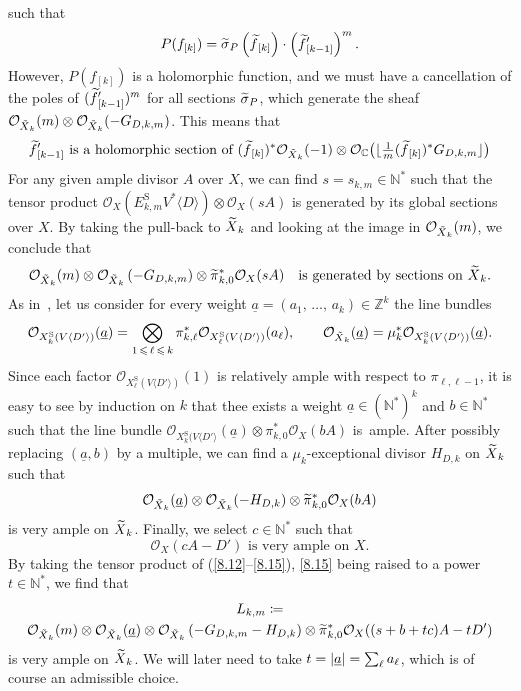 \documentclass[AHL,Unicode,longabstracts,published]{cedram}
\DeclarePairedDelimiter{\abs}{\lvert}{\rvert}
\newcommand*\rS{\mathrm{S}}
\newcommand*\cO{\mathcal{O}}
\newcommand*\bC{\mathbb{C}}
\newcommand*\bN{\mathbb{N}}
\newcommand*\bZ{\mathbb{Z}}
\let\leq\leqslant
\newcommand*\bydef{\coloneqq}
\let\oldtilde\tilde
\renewcommand*{\tilde}[1]{\mathchoice{\widetilde{#1}}{\widetilde{#1}}{\oldtilde{#1}}{\oldtilde{#1}}}
\begin{document}
such that
\[
P(f_{[k]})=\tilde\sigma_P\left(\tilde f_{[k]}\right)\cdot \left(\tilde f'_{[k-1]}\right)^m.
\]
However, $P(f_{[k]})$ is a holomorphic function, and we must have a cancellation of the poles of $(\tilde f'_{[k-1]})^m$ for all sections
$\tilde\sigma_P$, which generate the sheaf
$\cO_{\tilde X_k}(m)\otimes \cO_{\tilde X_k}(-G_{D,k,m})$. This means that
\begin{equation}\label{8.11}
\tilde f'_{[k-1]}
\text{ is a holomorphic section of } (\tilde f_{[k]})^*\cO_{\tilde X_k}(-1)\otimes
\cO_\bC\big(\lfloor\tfrac{1}{ m}(\tilde f_{[k]})^*G_{D,k,m}\rfloor\big)
\end{equation}
For any given ample divisor $A$ over $X$, we can find $s=s_{k,m}\in\bN^*$ such that the tensor product
$\cO_X(E^\rS_{k,m}V^*\langle D\rangle)\otimes\cO_X(sA)$ is generated by its global sections over $X$. By taking the pull-back to $\tilde X_k$ and looking at the image in $\cO_{\tilde X_k}(m)$, we conclude that
\begin{equation}\label{8.12}
\cO_{\tilde X_k}(m)\otimes\cO_{\tilde X_k}\left(-G_{D,k,m}\right)\otimes
\tilde\pi_{k,0}^*\cO_X(sA)\quad\text{is generated by sections on $\tilde X_k$}.
\end{equation}
As in~\cite{Dem97}, let us consider for every weight
$\underline a=(a_1,\,\dotsc,\,a_k)\in\bZ^k$ the line bundles
\begin{equation}\label{8.13}
\cO_{X^\rS_k(V\langle D'\rangle)}(\underline a)=
\bigotimes_{1\,\leq\,\ell\,\leq\,k}\pi_{k,\ell}^*\cO_{X^\rS_\ell(V\langle D'\rangle)}(a_\ell),
\qquad
\cO_{\tilde X_k}(\underline a)=\mu_k^*
\cO_{X^\rS_k(V\langle D'\rangle)}(\underline a).
\end{equation}
Since each factor $\cO_{X^\rS_\ell(V\langle D'\rangle)}(1)$ is relatively ample with respect to $\pi_{\ell,\ell-1}$, it is easy to see by induction on $k$ that thee exists a weight $\underline a\in(\bN^*)^k$ and $b\in\bN^*$ such that the line bundle
$\cO_{X^\rS_k(V\langle D'\rangle}(\underline a)\otimes\pi_{k,0}^*\cO_X(bA)$ is~ample. After possibly replacing $(\underline a,b)$ by a multiple, we can find a $\mu_k$-exceptional divisor $H_{D,k}$ on $\tilde X_k$ such that
\begin{equation}\label{8.14}
\cO_{\tilde X_k}(\underline a)\otimes
\cO_{\tilde X_k}(-H_{D,k})\otimes\tilde\pi_{k,0}^*\cO_X(bA)
\end{equation}
is very ample on $\tilde X_k$. Finally, we select $c\in\bN^*$ such that
\begin{equation}\label{8.15}
\cO_X(cA-D')\text{ is very ample on $X$}.
\end{equation}
By taking the tensor product of (\eqref{8.12}--\eqref{8.15}), \eqref{8.15} being raised to a power $t\in\bN^*$, we find that
\begin{multline}\label{8.16}
L_{k,m}
\bydef\\
\cO_{\tilde X_k}(m)\otimes\cO_{\tilde X_k}(\underline a)\otimes
\cO_{\tilde X_k}\left(-G_{D,k,m}-H_{D,k}\right)\otimes
\tilde\pi_{k,0}^*\cO_X((s+b+tc)A-tD')
\end{multline}
is very ample on $\tilde X_k$. We will later need to take
$t=\abs{\underline a}=\sum_\ell a_\ell$, which is of course an admissible choice.
\end{document}
